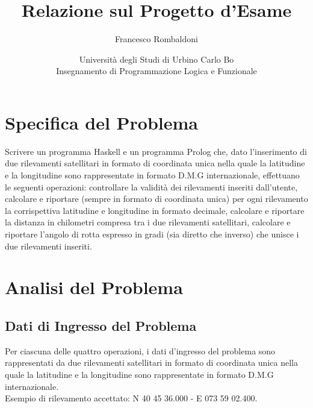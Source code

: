 \documentclass{article}
\title{\textbf{Relazione sul Progetto d'Esame}}
\author{Francesco Rombaldoni}
\date{\small Università degli Studi di Urbino Carlo Bo\\
	Insegnamento di Programmazione Logica e Funzionale}
\begin{document}
	\maketitle
	
	
\newpage

\section{Specifica del Problema}
Scrivere un programma Haskell e un programma Prolog che, dato l'inserimento di due rilevamenti satellitari in formato di coordinata unica nella quale la latitudine e la longitudine sono rappresentate in formato D.M.G internazionale, effettuano le seguenti operazioni: controllare la validità dei rilevamenti inseriti dall'utente, calcolare e riportare (sempre in formato di coordinata unica) per ogni rilevamento la corrispettiva latitudine e longitudine in formato decimale, calcolare e riportare la distanza in chilometri compresa tra i due rilevamenti satellitari, calcolare e riportare l'angolo di rotta espresso in gradi (sia diretto che inverso) che unisce i due rilevamenti inseriti.
\newline
\newline
\newpage
			
\section{Analisi del Problema}
\subsection{Dati di Ingresso del Problema}
Per ciascuna delle quattro operazioni, i dati d'ingresso del problema sono rappresentati da due rilevamenti satellitari in formato di coordinata unica nella quale la latitudine e la longitudine sono rappresentate in formato D.M.G internazionale. \\
Esempio di rilevamento accettato: N 40 45 36.000 - E 073 59 02.400.
\end{document}
